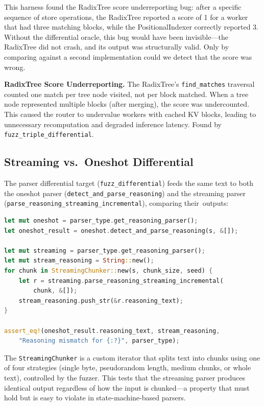 This harness found the RadixTree score underreporting bug: after a specific sequence of store operations, the RadixTree reported a score of 1 for a worker that had three matching blocks, while the PositionalIndexer correctly reported 3. Without the differential oracle, this bug would have been invisible---the RadixTree did not crash, and its output was structurally valid. Only by comparing against a second implementation could we detect that the score was wrong.

\begin{bugbox}
\textbf{RadixTree Score Underreporting.} The RadixTree's \texttt{find\_matches} traversal counted one match per tree node visited, not per block matched. When a tree node represented multiple blocks (after merging), the score was undercounted. This caused the router to undervalue workers with cached KV blocks, leading to unnecessary recomputation and degraded inference latency. Found by \texttt{fuzz\_triple\_differential}.
\end{bugbox}

\subsection{Streaming vs.\ Oneshot Differential}

The parser differential target (\texttt{fuzz\_differential}) feeds the same text to both the oneshot parser (\texttt{detect\_and\_parse\_reasoning}) and the streaming parser (\texttt{parse\_reasoning\_streaming\_\allowbreak incremental}), comparing their~outputs:

\begin{lstlisting}[language=Rust,caption={Streaming vs.\ oneshot differential for reasoning parsers.}]
let mut oneshot = parser_type.get_reasoning_parser();
let oneshot_result = oneshot.detect_and_parse_reasoning(s, &[]);

let mut streaming = parser_type.get_reasoning_parser();
let mut stream_reasoning = String::new();
for chunk in StreamingChunker::new(s, chunk_size, seed) {
    let r = streaming.parse_reasoning_streaming_incremental(
        chunk, &[]);
    stream_reasoning.push_str(&r.reasoning_text);
}

assert_eq!(oneshot_result.reasoning_text, stream_reasoning,
    "Reasoning mismatch for {:?}", parser_type);
\end{lstlisting}

The \texttt{StreamingChunker} is a custom iterator that splits text into chunks using one of four strategies (single byte, pseudorandom length, medium chunks, or whole text), controlled by the fuzzer. This tests that the streaming parser produces identical output regardless of how the input is chunked---a property that must hold but is easy to violate in state-machine-based parsers.

